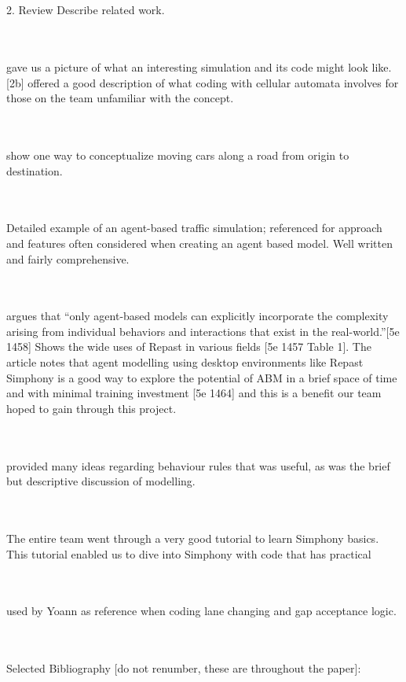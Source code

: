 \documentclass[11pt]{article}
\begin{document}
\\ \\

2. Review Describe related work.

\\ \\
[1a] gave us a picture of what an interesting simulation and its code might look like. [2b] offered a good description of what coding with cellular automata involves for those on the team unfamiliar with the concept.

\\ \\
[3c] show one way to conceptualize moving cars along a road from origin to destination. 

\\ \\
[4d] Detailed example of an agent-based traffic simulation; referenced for approach and features often considered when creating an agent based model. Well written and fairly comprehensive.

\\ \\
[5e] argues that “only agent-based models can explicitly incorporate the complexity arising from individual behaviors and interactions that exist in the real-world.”[5e 1458] Shows the wide uses of Repast in various fields [5e 1457 Table 1]. The article notes that agent modelling using desktop environments like Repast Simphony is a good way to explore the potential of ABM in a brief space of time and with minimal training investment [5e 1464] and this is a benefit our team hoped to gain through this project.

\\ \\
[6f] provided many ideas regarding behaviour rules that was useful, as was the brief but descriptive discussion of modelling.

\\ \\
[7g] The entire team went through a very good tutorial to learn Simphony basics. This tutorial enabled us to dive into Simphony with code that has practical 

\\ \\
[8h] used by Yoann as reference when coding lane changing and gap acceptance logic.

\\ \\

Selected Bibliography [do not renumber, these are throughout the paper]:
\end{document}
